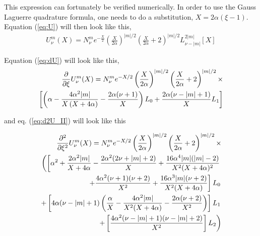 \documentclass[13pt,a4paper]{article}
\begin{document}
   This expression can fortunately be verified numerically.
   \newline \newline
   In order to use the Gauss Laguerre quadrature formula, one needs to do a
   substitution, \newline $X = 2\alpha(\xi - 1)$. 
   Equation (\ref{eq:U}) will then look like this,
    \begin{align}
	U_{\nu}^{m}(X) = N_{\nu}^m e^{-\frac{X}{2}}
	\left(\frac{X}{2\alpha}\right)^{|m|/2} 
	\left(\frac{X}{2\alpha} + 2\right)^{|m|/2} 
	L_{\nu - |m|}^{2|m|}[X]
	\label{eq:U_X}
    \end{align}


   Equation (\ref{eq:dU}) will look like this,
    \begin{align}
	\frac{\partial}{\partial \xi}U_{\nu}^{m}(X) = 
	N_{\nu}^m e^{-X/2} \left(\frac{X}{2\alpha}\right)^{|m|/2}
	\left(\frac{X}{2\alpha} + 2\right)^{|m|/2}\times \notag\\
	\left[	    
	    \left(
		\alpha 
		-
		\frac{4\alpha^2|m|}{X\left(X
		+ 4\alpha\right)} 
		- \frac{2\alpha(\nu + 1)}{X}
	    \right) L_0 +  
	    \frac{2\alpha(\nu - |m| + 1)}{X}L_1
	\right]
	\label{eq:dU_X}
    \end{align}


    and eq. (\ref{eq:d2U_II}) will look like this
    
    
    \begin{align}
	\frac{\partial^2}{\partial \xi^2}U_{\nu}^{m}(X) = 	
	N_{\nu}^m e^{-X/2} \left(\frac{X}{2\alpha}\right)^{|m|/2}
	\left(\frac{X}{2\alpha} + 2\right)^{|m|/2}\times \notag\\
	\left(
	    \left[
		  \alpha^2
		+ \frac{2\alpha^2|m|}{X + 4\alpha} 
		- \frac{2\alpha^2(2\nu + |m| + 2)}{X}
		+ \frac{16\alpha^4|m|(|m| - 2)}{X^2(X+4\alpha)^2}
		\right.\right. \notag \\  \left. \left.
		+ \frac{4\alpha^2(\nu + 1)(\nu + 2)}{X^2}
		+ \frac{16\alpha^3|m|(\nu + 2)}{X^2(X+4\alpha)}
	    \right]L_0	    
	    \right. \notag \\ \left.
	    +\left[
		4\alpha(\nu - |m| + 1) \left(
		      \frac{\alpha}{X}
		      - \frac{4\alpha^2|m|}{X^2(X+4\alpha)}
		      - \frac{2\alpha(\nu + 2)}{X^2}
		\right)
	    \right]L_1
	    \right. \notag \\ \left.
	    +\left[
		\frac{4\alpha^2(\nu - |m| + 1)(\nu - |m| + 2)}{X^2}
	    \right]L_2
	\right)
	\label{eq:d2U_X}
    \end{align}
    
\end{document}
